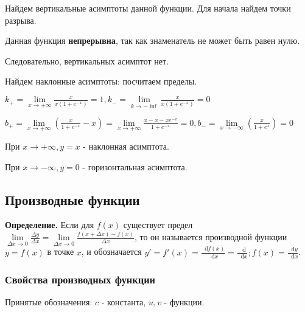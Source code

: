 \documentclass{article}
\newcommand*\diff{\mathop{}\!\mathrm{d}}
\begin{document}
\begin{flushleft}
\hfill

Найдем вертикальные асимптоты данной функции. Для начала найдем точки разрыва.

Данная функция \textbf{непрерывна}, так как знаменатель не может быть равен нулю.

Следовательно, вертикальных асимптот нет.

\hfill 

Найдем наклонные асимптоты: посчитаем пределы.

$k_{+} = \lim\limits_{x \to +\infty} \frac{x}{x(1+e^{-x})} = 1, k_{-} = \lim\limits_{k \to -\inf} \frac{x}{x(1+e^{-x})} = 0$

$b_{+} = \lim\limits_{x \to +\infty} (\frac{x}{1+e^{-x}} - x) = \lim\limits_{x \to +\infty} \frac{x - x - x e^{-x}}{1 + e^{-x}} = 0, b_{-} = \lim\limits_{x \to -\infty} (\frac{x}{1 + e^x}) = 0$

\hfill

При $x \to +\infty, y = x$ - наклонная асимптота.

При $x \to -\infty, y = 0$ - горизонтальная асимптота.

\subsection{Производные функции}

\textbf{Определение.} Если для $f(x)$ существует предел $\lim\limits_{\Delta x \to 0} \frac{\Delta y}{\Delta x} = \lim\limits_{\Delta x \to 0} \frac{f(x + \Delta x) - f(x)}{\Delta x}$, то он называется производной функции $y = f(x)$ в точке $x$, и обозначается $y' = f'(x) = \frac{\diff f(x)}{\diff x} = \frac{\diff}{\diff x}; f(x) = \frac{\diff y}{\diff x}$.

\subsubsection{Свойства производных функции}

Принятые обозначения: $c$ - константа, $u, v$ - функции.

\begin{multienumerate}
\end{multienumerate}


\end{flushleft}
\end{document}
